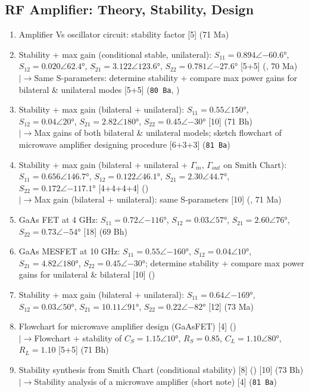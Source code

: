 \documentclass[12pt]{article}
\newcommand{\lb}{\\$\left|\rightarrow\right.$}
\begin{document}
  \subsection{RF Amplifier: Theory, Stability, Design}
    \begin{enumerate}[topsep=0pt, noitemsep]
      \item Amplifier Vs oscillator circuit: stability factor \hfill [5] (71 Ma)
      \item Stability + max gain (conditional stable, unilateral): $S_{11}{=}0.894\angle{-60.6°}$, $S_{12}{=}0.020\angle62.4°$, $S_{21}{=}3.122\angle123.6°$, $S_{22}{=}0.781\angle{-27.6°}$ \hfill [5+5] (, 70 Ma)
        \lb Same S-parameters: determine stability + compare max power gains for bilateral \& unilateral modes \hfill [5+5] (\texttt{80 Ba}, )
      \item Stability + max gain (bilateral + unilateral): $S_{11}{=}0.55\angle150°$, $S_{12}{=}0.04\angle20°$, $S_{21}{=}2.82\angle180°$, $S_{22}{=}0.45\angle{-30°}$ \hfill [10] (71 Bh)
        \lb Max gains of both bilateral \& unilateral models; sketch flowchart of microwave amplifier designing procedure \hfill [6+3+3] (\texttt{81 Ba})
      \item Stability + max gain (bilateral + unilateral + $\Gamma_{in}$, $\Gamma_{out}$ on Smith Chart): $S_{11}{=}0.656\angle146.7°$, $S_{12}{=}0.122\angle46.1°$, $S_{21}{=}2.30\angle44.7°$, $S_{22}{=}0.172\angle{-117.1°}$ \hfill [4+4+4+4] ()
        \lb Max gain (bilateral + unilateral): same S-parameters \hfill [10] (, 71 Ma)
      \item GaAs FET at 4 GHz: $S_{11}{=}0.72\angle{-116°}$, $S_{12}{=}0.03\angle57°$, $S_{21}{=}2.60\angle76°$, $S_{22}{=}0.73\angle{-54°}$ \hfill [18] (69 Bh)
      \item GaAs MESFET at 10 GHz: $S_{11}{=}0.55\angle{-160°}$, $S_{12}{=}0.04\angle10°$, $S_{21}{=}4.82\angle180°$, $S_{22}{=}0.45\angle{-30°}$; determine stability + compare max power gains for unilateral \& bilateral \hfill [10] ()
      \item Stability + max gain (bilateral + unilateral): $S_{11}{=}0.64\angle{-169°}$, $S_{12}{=}0.03\angle50°$, $S_{21}{=}10.11\angle91°$, $S_{22}{=}0.22\angle{-82°}$ \hfill [12] (73 Ma)
      \item Flowchart for microwave amplifier design (GaAsFET) \hfill [4] ()
        \lb Flowchart + stability of $C_S{=}1.15\angle10°$, $R_S{=}0.85$, $C_L{=}1.10\angle80°$, $R_L{=}1.10$ \hfill [5+5] (71 Bh)
      \item Stability synthesis from Smith Chart (conditional stability) \hfill [8] () [10] (73 Bh)
        \lb Stability analysis of a microwave amplifier (short note) \hfill [4] (\texttt{81 Ba})
    \end{enumerate}
\end{document}

